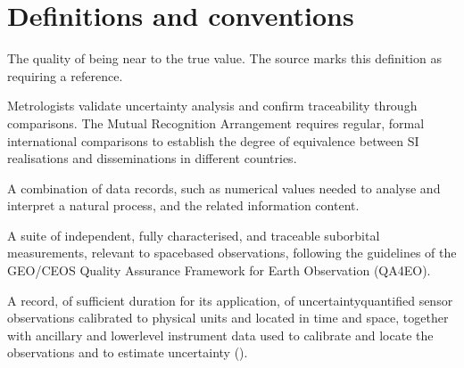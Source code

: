 \documentclass[a4paper,10pt,english]{sphinxmanual}
\begin{document}
\section{Definitions and conventions}
\label{\detokenize{01_introduction:definitions-and-conventions}}\begin{description}
\sphinxAtStartPar
The quality of being near to the true value. The source marks this
definition as requiring a reference.

\sphinxAtStartPar
Metrologists validate uncertainty analysis and confirm traceability
through comparisons. The Mutual Recognition Arrangement requires
regular, formal international comparisons to establish the degree of
equivalence between SI realisations and disseminations in different
countries.

\sphinxAtStartPar
A combination of data records, such as numerical values needed to analyse
and interpret a natural process, and the related information content.

\sphinxAtStartPar
A suite of independent, fully characterised, and traceable sub\sphinxhyphen{}orbital
measurements, relevant to space\sphinxhyphen{}based observations, following the
guidelines of the GEO/CEOS Quality Assurance Framework for Earth
Observation (QA4EO).

\sphinxAtStartPar
A record, of sufficient duration for its application, of
uncertainty\sphinxhyphen{}quantified sensor observations calibrated to physical units
and located in time and space, together with ancillary and lower\sphinxhyphen{}level
instrument data used to calibrate and locate the observations and to
estimate uncertainty ({\hyperref[\detokenize{04_uncertainty_analysis:ref-qa4eo1}]{}}).


\end{description}
\end{document}
